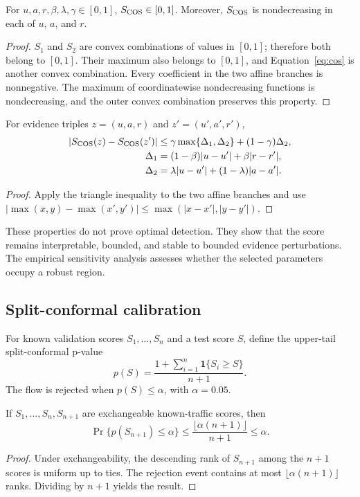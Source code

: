 \begin{proposition}
For $u,a,r,\beta,\lambda,\gamma\in[0,1]$, $S_{\rm COS}\in[0,1]$. Moreover, $S_{\rm COS}$ is nondecreasing in each of $u$, $a$, and $r$.
\end{proposition}
\begin{proof}
$S_1$ and $S_2$ are convex combinations of values in $[0,1]$; therefore both belong to $[0,1]$. Their maximum also belongs to $[0,1]$, and Equation~\eqref{eq:cos} is another convex combination. Every coefficient in the two affine branches is nonnegative. The maximum of coordinatewise nondecreasing functions is nondecreasing, and the outer convex combination preserves this property.
\end{proof}

\begin{proposition}
For evidence triples $z=(u,a,r)$ and $z'=(u',a',r')$,
\begin{align}
|S_{\rm COS}(z)-S_{\rm COS}(z')|
&\leq \gamma\max\{\Delta_1,\Delta_2\}+(1-\gamma)\Delta_2,\\
\Delta_1&=(1-\beta)|u-u'|+\beta|r-r'|,\\
\Delta_2&=\lambda|u-u'|+(1-\lambda)|a-a'|.
\end{align}
\end{proposition}
\begin{proof}
Apply the triangle inequality to the two affine branches and use
$|\max(x,y)-\max(x',y')|\leq\max(|x-x'|,|y-y'|)$.
\end{proof}

These properties do not prove optimal detection. They show that the score remains interpretable, bounded, and stable to bounded evidence perturbations. The empirical sensitivity analysis assesses whether the selected parameters occupy a robust region.

\subsection{Split-conformal calibration}

For known validation scores $S_1,\ldots,S_n$ and a test score $S$, define the upper-tail split-conformal p-value
\begin{equation}
p(S)=\frac{1+\sum_{i=1}^{n}\mathbf{1}\{S_i\geq S\}}{n+1}.
\label{eq:pvalue}
\end{equation}
The flow is rejected when $p(S)\leq\alpha$, with $\alpha=0.05$.

\begin{theorem}
If $S_1,\ldots,S_n,S_{n+1}$ are exchangeable known-traffic scores, then
\begin{equation}
\Pr\{p(S_{n+1})\leq\alpha\}
\leq \frac{\lfloor\alpha(n+1)\rfloor}{n+1}\leq\alpha.
\end{equation}
\end{theorem}
\begin{proof}
Under exchangeability, the descending rank of $S_{n+1}$ among the $n+1$ scores is uniform up to ties. The rejection event contains at most $\lfloor\alpha(n+1)\rfloor$ ranks. Dividing by $n+1$ yields the result.
\end{proof}

